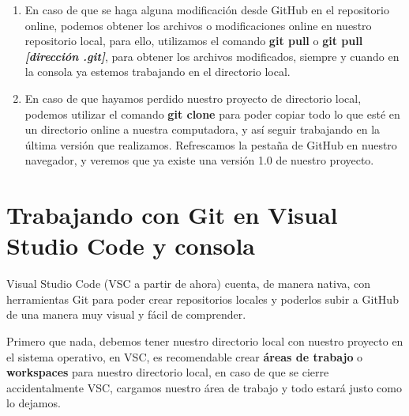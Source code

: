 \begin{enumerate}
    \item En caso de que se haga alguna modificación desde GitHub en el repositorio online, podemos obtener los archivos o modificaciones online en nuestro repositorio local, para ello, utilizamos el comando \textbf{git pull} o \textbf{git pull \textit{[dirección .git]}}, para obtener los archivos modificados, siempre y cuando en la consola ya estemos trabajando en el directorio local.
    \item En caso de que hayamos perdido nuestro proyecto de directorio local, podemos utilizar el comando \textbf{git clone} para poder copiar todo lo que esté en un directorio online a nuestra computadora, y así seguir trabajando en la última versión que realizamos. Refrescamos la pestaña de GitHub en nuestro navegador, y veremos que ya existe una versión 1.0 de nuestro proyecto.
\end{enumerate}





\section{Trabajando con Git en Visual Studio Code y consola}
\hspace{0.55cm}Visual Studio Code (VSC a partir de ahora) cuenta, de manera nativa, con herramientas Git para poder crear repositorios locales y poderlos subir a GitHub de una manera muy visual y fácil de comprender.

Primero que nada, debemos tener nuestro directorio local con nuestro proyecto en el sistema operativo, en VSC, es recomendable crear \textbf{áreas de trabajo} o \textbf{workspaces} para nuestro directorio local, en caso de que se cierre accidentalmente VSC, cargamos nuestro área de trabajo y todo estará justo como lo dejamos.

